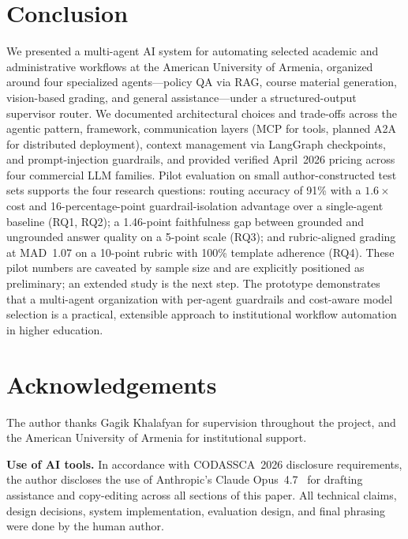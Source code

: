 \documentclass[conference]{IEEEtran}
\begin{document}
\section{Conclusion}

We presented a multi-agent AI system for automating selected academic and administrative workflows at the American University of Armenia, organized around four specialized agents---policy QA via RAG, course material generation, vision-based grading, and general assistance---under a structured-output supervisor router. We documented architectural choices and trade-offs across the agentic pattern, framework, communication layers (MCP for tools, planned A2A for distributed deployment), context management via LangGraph checkpoints, and prompt-injection guardrails, and provided verified April~2026 pricing across four commercial LLM families. Pilot evaluation on small author-constructed test sets supports the four research questions: routing accuracy of 91\% with a $1.6\times$ cost and 16-percentage-point guardrail-isolation advantage over a single-agent baseline (RQ1, RQ2); a 1.46-point faithfulness gap between grounded and ungrounded answer quality on a 5-point scale (RQ3); and rubric-aligned grading at MAD~1.07 on a 10-point rubric with 100\% template adherence (RQ4). These pilot numbers are caveated by sample size and are explicitly positioned as preliminary; an extended study is the next step. The prototype demonstrates that a multi-agent organization with per-agent guardrails and cost-aware model selection is a practical, extensible approach to institutional workflow automation in higher education.

\section*{Acknowledgements}

The author thanks Gagik Khalafyan for supervision throughout the project, and the American University of Armenia for institutional support.

\textbf{Use of AI tools.} In accordance with CODASSCA~2026 disclosure requirements, the author discloses the use of Anthropic's Claude Opus~4.7~\cite{anthropic_claude_2026} for drafting assistance and copy-editing across all sections of this paper. All technical claims, design decisions, system implementation, evaluation design, and final phrasing were done by the human author. 
\end{document}
